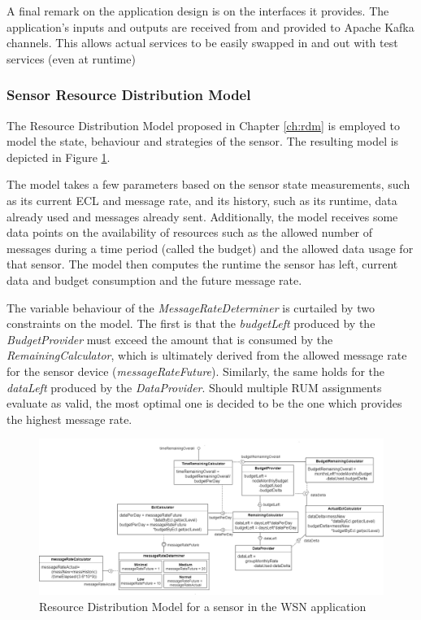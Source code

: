 A final remark on the application design is on the interfaces it provides. The application's inputs and outputs are received from and provided to Apache Kafka channels. This allows actual services to be easily swapped in and out with test services (even at runtime)

\subsubsection{Sensor Resource Distribution Model}
The Resource Distribution Model proposed in Chapter \ref{ch:rdm} is employed to model the state, behaviour and strategies of the sensor. The resulting model is depicted in Figure \ref{fig:sensit_rdm}.

The model takes a few parameters based on the sensor state measurements, such as its current ECL and message rate, and its history, such as its runtime, data already used and messages already sent. Additionally, the model receives some data points on the availability of resources such as the allowed number of messages during a time period (called the budget) and the allowed data usage for that sensor. The model then computes the runtime the sensor has left, current data and budget consumption and the future message rate.

The variable behaviour of the \emph{MessageRateDeterminer} is curtailed by two constraints on the model. The first is that the \emph{budgetLeft} produced by the \emph{BudgetProvider} must exceed the amount that is consumed by the \emph{RemainingCalculator}, which is ultimately derived from the allowed message rate for the sensor device (\emph{messageRateFuture}). Similarly, the same holds for the \emph{dataLeft} produced by the \emph{DataProvider}. Should multiple RUM assignments evaluate as valid, the most optimal one is decided to be the one which provides the highest message rate.

\begin{figure}
\centering
\includegraphics[width=1.1\textwidth]{resources/img/sensit_rdm_sideways.png}
\caption{Resource Distribution Model for a sensor in the \idsystems\sensit WSN application}
\label{fig:sensit_rdm}
\end{figure}


